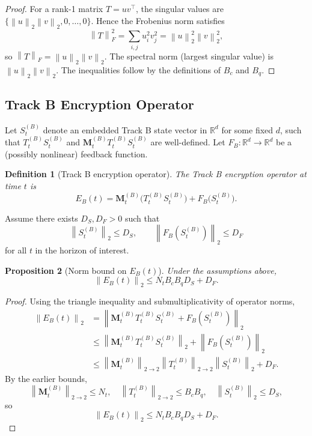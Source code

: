 \documentclass[11pt]{article}
\newtheorem{definition}{Definition}[section]
\newtheorem{proposition}[definition]{Proposition}
\newcommand{\R}{\mathbb{R}}
\newcommand{\norm}[1]{\left\lVert #1 \right\rVert}
\begin{document}
\begin{proof}
For a rank-1 matrix \(T = u v^\top\), the singular values are \(\{\norm{u}_2 \norm{v}_2,0,\dots,0\}\).
Hence the Frobenius norm satisfies
\[
  \norm{T}_F^2 = \sum_{i,j} u_i^2 v_j^2 = \norm{u}_2^2 \norm{v}_2^2,
\]
so \(\norm{T}_F = \norm{u}_2 \norm{v}_2\).
The spectral norm (largest singular value) is \(\norm{u}_2 \norm{v}_2\).
The inequalities follow by the definitions of \(B_c\) and \(B_q\).
\end{proof}

\subsection{Track B Encryption Operator}

Let \(S_t^{(B)}\) denote an embedded Track B state vector in \(\R^d\) for some fixed \(d\), such that \(T_t^{(B)} S_t^{(B)}\) and \(\mathbf{M}_t^{(B)} T_t^{(B)} S_t^{(B)}\) are well-defined.
Let \(F_B : \R^d \to \R^d\) be a (possibly nonlinear) feedback function.

\begin{definition}[Track B encryption operator]
The Track B encryption operator at time \(t\) is
\[
  E_B(t) = \mathbf{M}_t^{(B)} \bigl( T_t^{(B)} S_t^{(B)} \bigr) + F_B\bigl(S_t^{(B)}\bigr).
\]
\end{definition}

Assume there exists \(D_S, D_F > 0\) such that
\[
  \norm{S_t^{(B)}}_2 \le D_S, \qquad
  \norm{F_B(S_t^{(B)})}_2 \le D_F
\]
for all \(t\) in the horizon of interest.

\begin{proposition}[Norm bound on \(E_B(t)\)]
Under the assumptions above,
\[
  \norm{E_B(t)}_2 \le N_t B_c B_q D_S + D_F.
\]
\end{proposition}

\begin{proof}
Using the triangle inequality and submultiplicativity of operator norms,
\begin{align*}
  \norm{E_B(t)}_2
  &= \norm{\mathbf{M}_t^{(B)} T_t^{(B)} S_t^{(B)} + F_B(S_t^{(B)})}_2 \\
  &\le \norm{\mathbf{M}_t^{(B)} T_t^{(B)} S_t^{(B)}}_2 + \norm{F_B(S_t^{(B)})}_2 \\
  &\le \norm{\mathbf{M}_t^{(B)}}_{2\to2} \norm{T_t^{(B)}}_{2\to2} \norm{S_t^{(B)}}_2 + D_F.
\end{align*}
By the earlier bounds,
\[
  \norm{\mathbf{M}_t^{(B)}}_{2\to2} \le N_t, \quad
  \norm{T_t^{(B)}}_{2\to2} \le B_c B_q, \quad
  \norm{S_t^{(B)}}_2 \le D_S,
\]
so
\[
  \norm{E_B(t)}_2 \le N_t B_c B_q D_S + D_F.
\]
\end{proof}
\end{document}
